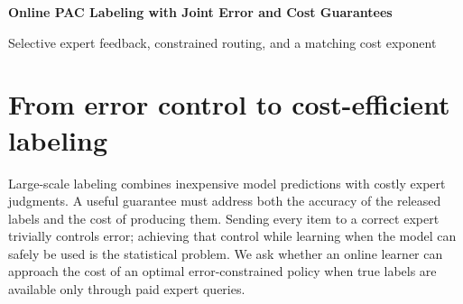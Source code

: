 \documentclass[11pt]{article}
\theoremstyle{remark}
\begin{document}
\begin{center}
{\Large\bfseries Online PAC Labeling with Joint Error and Cost Guarantees\par}
\medskip
Selective expert feedback, constrained routing, and a matching cost exponent
\end{center}

\begin{abstract}
We study online labeling with a cheap predictor and a costly, correct
expert. Each expert query both prevents a released-label error and reveals
feedback about the predictor; released model labels supply no feedback.
The objective is to control cumulative released error while approaching
the cost of an optimal feasible score-based policy. Under i.i.d. arrivals,
a fixed predictor and score, and a known global Lipschitz bound on
conditional model error, we propose one-sided barrier saddle routing
(OBSR). It learns a possibly nonmonotone release policy and an error
price from selectively revealed labels. We prove simultaneous
high-probability bounds of order $\widetilde O(T^{2/3})$ on cumulative
error excess and cost regret against all feasible Borel score policies.
An explicit target-tightening condition gives nominal PAC error control
with sublinear excess cost. A complementary information-theoretic
construction yields a $T^{2/3}$ lower bound on a weighted cost--error
tradeoff. Together, these results determine the minimax cost exponent,
up to logarithmic factors, for a specified nominal-PAC class with failure
probability $T^{-2}$. We provide explicit updates and complete proofs;
empirical validation is left to future work.
\end{abstract}

\section{From error control to cost-efficient labeling}
\label{sec:intro}

Large-scale labeling combines inexpensive model predictions with costly
expert judgments. A useful guarantee must address both the accuracy of
the released labels and the cost of producing them. Sending every item
to a correct expert trivially controls error; achieving that control
while learning when the model can safely be used is the statistical
problem. We ask whether an online learner can approach the cost of an
optimal error-constrained policy when true labels are available only
through paid expert queries.
\end{document}
